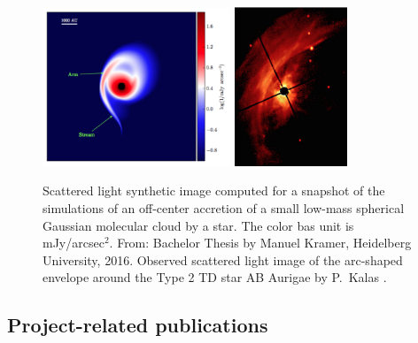 \documentclass[10pt,fleqn,twoside,a4paper]{article}
\begin{document}
\begin{figure}
\centerline{\includegraphics[width=0.5\textwidth]{D2Fig/Kramer_Fig4-12-eps-converted-to.pdf}
\hspace{2em}\includegraphics[width=0.3\textwidth]{D2Fig/Kalas-eps-converted-to.pdf}
}
\caption{\label{fig-kramer-4.12} Scattered light
  synthetic image computed for a snapshot of the simulations of an
  off-center accretion of a small low-mass spherical Gaussian molecular
  cloud by a star. The color bas unit is mJy/arcsec$^2$. From: Bachelor
  Thesis by Manuel Kramer, Heidelberg University,
  2016.  Observed scattered light image of the
  arc-shaped envelope around the Type 2 TD star AB Aurigae by P.~Kalas
  \citep{1999ApJ...523L.151G}.}
\end{figure}





\subsection{Project-related publications}

\end{document}
